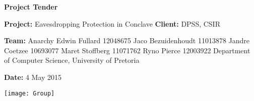 \begin{titlepage}
	\begin{center}
		\large{\textbf{Project Tender}}\newline
	\end{center}
		\vfill
	\begin{center}
		\LARGE{\textbf{Project:}}\large{ Eavesdropping Protection in Conclave}\newline
		\textbf{Client:} DPSS, CSIR\newline
	\end{center}
		\vfill
	\begin{center}
		\LARGE{\textbf{Team:} Anarchy}\newline
		\large{Edwin Fullard 12048675}\newline
		\large{Jaco Bezuidenhoudt 11013878}\newline
		\large{Jandre Coetzee 10693077}\newline
		\large{Maret Stoffberg 11071762}\newline
		\large{Ryno Pierce 12003922}\newline
		\small{Department of Computer Science, University of Pretoria}\newline
	\end{center}
		\vfill
	\begin{center}
		\large{\textbf{Date:} 4 May 2015}
	\end{center}
		\vfill
	\begin{center}
		\texttt{[image: Group]}
	\end{center}
\end{titlepage}
